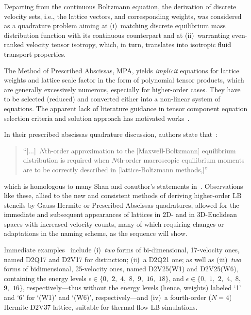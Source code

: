     Departing from the continuous Boltzmann equation, the derivation of discrete velocity sets, i.e., the lattice  vectors,  and
    corresponding weights, was considered as a quadrature problem aiming at (i)~matching discrete equilibrium mass  distribution
    function with its continuous counterpart and at (ii)~warranting  even-ranked  velocity  tensor  isotropy,  which,  in  turn,
    translates into isotropic fluid transport properties.

    The Method of Prescribed Abscissas, MPA, yields \emph{implicit} equations for lattice weights and lattice  scale  factor  in
    the form of polynomial tensor products, which are generally excessively numerous, especially for  higher-order  cases.  They
    have to be selected (reduced) and converted either into a non-linear system of equations. The apparent  lack  of  literature
    guidance   in    tensor    component    equation    selection    criteria    and    solution    approach    has    motivated
    works~\cite{2016-AndradeFN-MEngUTFPR, 2019-daRosaTG-MEngUTFPR}.

    In their prescribed abscissas quadrature discussion, authors state that~\cite[p.~6]{2006-PhilippiPC+SurmasR-PhysRevE}:
    \begin{quote}
        \swshape
        ``[...]~$N$th-order approximation to the [Maxwell-Boltzmann]  equilibrium  distribution  is  required  when  $N$th-order
        macroscopic equilibrium moments are to be correctly described in [lattice-Boltzmann methods,]''
    \end{quote}
    \noindent which is homologous to many Shan and  coauthor's  statements  in~\cite{2006-ShanX+ChenH-JFluidMech}.  Observations
    like these, allied to the new and consistent methods of deriving higher-order LB stencils  by  Gauss-Hermite  or  Prescribed
    Abscissas quadratures, allowed for the immediate and subsequent appearances of lattices in 2D- and  in  3D-Euclidean  spaces
    with increased velocity counts, many of which requiring changes or adaptations in the naming scheme, as  the  sequence  will
    show.

    Immediate examples~\cite{2006-PhilippiPC+SurmasR-PhysRevE} include (i)~\emph{two} forms of bi-dimensional, 17-velocity ones,
    named D2Q17 and D2V17 for distinction; (ii)~a D2Q21 one; as well as (iii)~\emph{two}  forms  of  bidimensional,  25-velocity
    ones, named D2V25(W1) and D2V25(W6), containing the energy levels $\epsilon \in \{0,$ $2,$ $4,$ $8,$ $9,$ $16,$ $18\}$,  and
    $\epsilon \in \{0,$ $1,$ $2,$ $4,$ $8,$ $9,$ $16\}$, respectively---thus without the energy levels (hence, weights)  labeled
    `1' and `6' for `(W1)' and `(W6)', respectively---and (iv)~a  fourth-order  ($N=4$)  Hermite  D2V37  lattice,  suitable  for
    thermal flow LB simulations.


